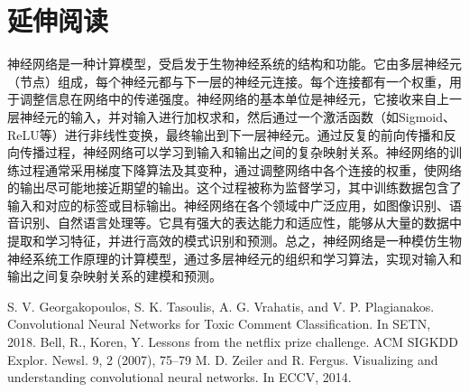 \documentclass[conference]{IEEEtran}
\begin{document}
\section{延伸阅读}
神经网络是一种计算模型，受启发于生物神经系统的结构和功能。它由多层神经元（节点）组成，每个神经元都与下一层的神经元连接。每个连接都有一个权重，用于调整信息在网络中的传递强度。神经网络的基本单位是神经元，它接收来自上一层神经元的输入，并对输入进行加权求和，然后通过一个激活函数（如Sigmoid、ReLU等）进行非线性变换，最终输出到下一层神经元。通过反复的前向传播和反向传播过程，神经网络可以学习到输入和输出之间的复杂映射关系。神经网络的训练过程通常采用梯度下降算法及其变种，通过调整网络中各个连接的权重，使网络的输出尽可能地接近期望的输出。这个过程被称为监督学习，其中训练数据包含了输入和对应的标签或目标输出。神经网络在各个领域中广泛应用，如图像识别、语音识别、自然语言处理等。它具有强大的表达能力和适应性，能够从大量的数据中提取和学习特征，并进行高效的模式识别和预测。总之，神经网络是一种模仿生物神经系统工作原理的计算模型，通过多层神经元的组织和学习算法，实现对输入和输出之间复杂映射关系的建模和预测。
\begin{thebibliography}{00}
S. V. Georgakopoulos, S. K. Tasoulis, A. G. Vrahatis, and V. P. Plagianakos. Convolutional Neural Networks for Toxic Comment Classification. In SETN, 2018.
 Bell, R., Koren, Y. Lessons from the 
netflix prize challenge. ACM SIGKDD 
Explor. Newsl. 9, 2 (2007), 75–79
 M. D. Zeiler and R. Fergus. Visualizing and understanding convolutional neural networks. In ECCV, 2014.

\end{thebibliography}
\end{document}
